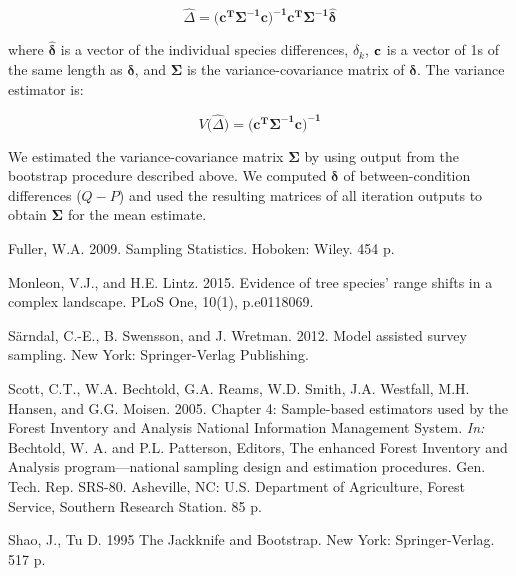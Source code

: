 \documentclass[12pt]{article}
\begin{document}
 \begin{equation} \label{eq:gls}
\hat{\Delta} = \big(\mathbf{c^T\Sigma^{-1}c\big)^{-1}c^T\Sigma^{-1}}\hat{\boldsymbol{\delta}}
\end{equation}

where $\hat{\boldsymbol{\delta}}$ is a vector of the individual species differences, $\hat{\delta}_k$, $\bold{c}$ is a vector of 1s of the same length as $\hat{\boldsymbol{\delta}}$, and $\mathbf{\Sigma}$ is the variance-covariance matrix of $\boldsymbol{\delta}$.  The variance estimator is: 

 \begin{equation} \label{eq:glsV}
V\big(\hat{\Delta}\big) = \big(\mathbf{c^T\Sigma^{-1}c\big)^{-1}}
\end{equation}

We estimated the variance-covariance matrix $\mathbf{\Sigma}$ by using output from the bootstrap procedure described above.  We computed $\boldsymbol{\delta}$ of between-condition differences ($Q - P$) and used the resulting matrices of all iteration outputs to obtain $\mathbf{\Sigma}$ for the mean estimate. 

\begin{thebibliography}{2}



 Fuller, W.A.  2009.  Sampling Statistics. Hoboken: Wiley. 454 p.

 Monleon, V.J., and H.E. Lintz.  2015. Evidence of tree species’ range shifts in a complex landscape. PLoS One, 10(1), p.e0118069.

 S{\"a}rndal, C.-E., B. Swensson, and J. Wretman.  2012.  Model assisted survey sampling.  New York: Springer-Verlag Publishing.

 Scott, C.T., W.A. Bechtold, G.A. Reams, W.D. Smith, J.A. Westfall, M.H. Hansen, and G.G. Moisen.  2005.  Chapter 4: Sample-based estimators used by the Forest Inventory and Analysis National Information Management System.  \emph{In:} Bechtold, W. A. and P.L. Patterson, Editors, The enhanced Forest Inventory and Analysis program—national sampling design and estimation procedures. Gen. Tech. Rep. SRS-80. Asheville, NC: U.S. Department of Agriculture, Forest Service, Southern Research Station. 85 p.

 Shao, J., Tu D. 1995 The Jackknife and Bootstrap. New York: Springer-Verlag. 517 p.

\end{thebibliography}
\end{document}
